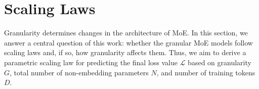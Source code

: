 \section{Scaling Laws}\label{sec:scaling_laws}


Granularity determines changes in the architecture of MoE. In this section, we answer a central question of this work: whether the granular MoE models follow scaling laws and, if so, how granularity affects them. Thus, we aim to derive a parametric scaling law for predicting the final loss value $\mathcal{L}$ based on granularity $G$, total number of non-embedding parameters $N$, and number of training tokens $D$. 




